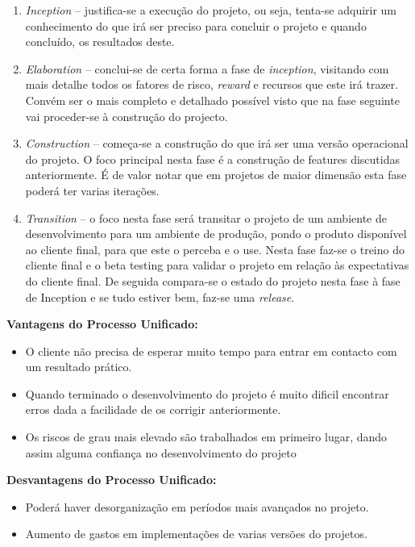 \documentclass[12pt, a4paper, twoside]{report} %
\begin{document}
\begin{enumerate}
\item \textit{Inception} – justifica-se a execução do projeto, ou seja, tenta-se adquirir um conhecimento do que irá ser preciso para concluir o projeto e quando concluído, os resultados deste.

\item \textit{Elaboration} – conclui-se de certa forma a fase de \textit{inception}, visitando com mais detalhe todos os fatores de risco, \textit{reward} e recursos que este irá trazer. Convém ser o mais completo e detalhado possível visto que na fase seguinte vai proceder-se à construção do projecto.

\item \textit{Construction} – começa-se a construção do que irá ser uma versão operacional do projeto. O foco principal nesta fase é a construção de features discutidas anteriormente. É de valor notar que em projetos de maior dimensão esta fase poderá ter varias iterações.

\item \textit{Transition} – o foco nesta fase será transitar o projeto de um ambiente de desenvolvimento para um ambiente de produção, pondo o produto disponível ao cliente final, para que este o perceba e o use. Nesta fase faz-se o treino do cliente final e o beta testing para validar o projeto em relação às expectativas do cliente final. De seguida compara-se o estado do projeto nesta fase à fase de Inception e se tudo estiver bem, faz-se uma \textit{release}.

\end{enumerate}

\textbf{Vantagens do Processo Unificado:}
\begin{itemize}
\item O cliente não precisa de esperar muito tempo para entrar em contacto com um resultado prático.
\item Quando terminado o desenvolvimento do projeto é muito dificil encontrar erros dada a facilidade de os corrigir anteriormente.
\item Os riscos de grau mais elevado são trabalhados em primeiro lugar, dando assim alguma confiança no desenvolvimento do projeto
\end{itemize}

\textbf{Desvantagens do Processo Unificado:}
\begin{itemize}
\item Poderá haver desorganização em períodos mais avançados no projeto.
\item Aumento de gastos em implementações de varias versões do projetos.
\end{itemize}
\end{document}
